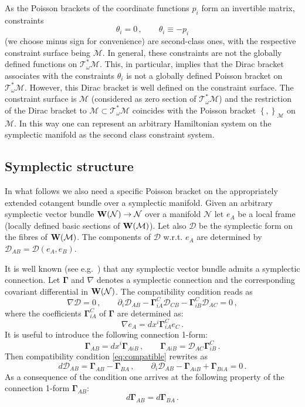 \documentclass[a4paper,11pt]{amsart}
\numberwithin{thm}{section} %
\numberwithin{equation}{section} %
\numberwithin{figure}{section} %
\newcommand{\pb}[2]{\left\{{}#1{},{}#2{}\right\}}
\renewcommand{\:}{{\rm\, :\,}}
\def\d{\partial}
\def\mod{{\mathcal T}^*_\omega}
\def\manM{{\mathcal M}}
\def\manN{{\mathcal N}}
\def\W{{\bf W}}
\def\mcon{{\boldsymbol\Gamma}}
\def\mD{\mathcal{D}}
\def\mnabla{\mathfrak{\nabla}}
\begin{document}
As the Poisson brackets of the coordinate functions $p_i$
form an invertible matrix, constraints
\begin{equation}
\theta_i=0\,,\qquad \theta_i\equiv -p_i
\end{equation}
(we choose minus sign for convenience) are second-class ones, with the
respective constraint surface being $\manM$.  In general, these
constraints are not the globally defined functions on $\mod\manM$.
This, in particular, implies that the Dirac bracket associates with
the constraints $\theta_i$ is not a globally defined Poisson bracket
on $\mod\manM$.  However, this Dirac bracket is well defined on the
constraint surface.  The constraint surface is $\manM$ (considered as
zero section of $\mod\manM$) and the restriction of the Dirac
bracket to $\manM \subset \mod\manM$ coincides with the Poisson
bracket $\pb{}{}_\manM$ on $\manM$.  In this way one can represent an
arbitrary Hamiltonian system on the symplectic manifold as the second
class constraint system.



\subsection{Symplectic structure}\label{subsec:symplectic}
In what follows we also need a specific Poisson bracket
on the appropriately extended cotangent bundle over a symplectic
manifold.   Given an arbitrary symplectic vector
bundle $\W(\manN) \to \manN$ over a manifold $\manN$ let $e_A$ be
a local frame (locally defined basic sections of $\W(\manM)$).  Let
also $\mD$ be the symplectic form on the fibres of $\W(\manM)$.  The
components of $\mD$ w.r.t. $e_A$ are determined by
$\mD_{AB}=\mD(e_A,e_B)$.

It is well known (see e.g.~\cite{[Fedosov-book]}) that any symplectic
vector bundle admits a symplectic connection.  Let $\mcon$ and
$\mnabla$ denotes a symplectic connection and the corresponding covariant
differential in $\W(\manN)$. The compatibility condition reads as
\begin{equation}
\label{eq:compatible}
  \mnabla \mD=0\,,  \qquad \d_i \mD_{AB} - \mcon^C_{iA}\mD_{CB}-\mcon^C_{iB}\mD_{AC}=0\,,
\end{equation}
where the coefficients $\mcon^C_{iA}$ of $\mcon$ are determined
as:
\begin{equation}
  \mnabla e_A=dx^i \mcon^C_{iA}e_C\,.
\end{equation}
It is useful to introduce the following connection 1-form:
\begin{equation}
\mcon_{AB}=dx^i \mcon_{AiB}\,, \qquad  \mcon_{AiB}=\mD_{AC}\mcon^C_{iB}\,.
\end{equation}
Then compatibility condition \eqref{eq:compatible} rewrites as
\begin{equation}
\label{eq:compatible-l}
d\mD_{AB}=\mcon_{AB}-\mcon_{BA}\,, \qquad  \d_i \mD_{AB} - \mcon_{AiB}+\mcon_{BiA}=0\,.
\end{equation}
As a consequence of the condition one arrives at the following
property of the connection 1-form $\mcon_{AB}$:
\begin{equation}
\label{eq:dC-symm}
  d\mcon_{AB}=d\mcon_{BA}\,.
\end{equation}
\end{document}

